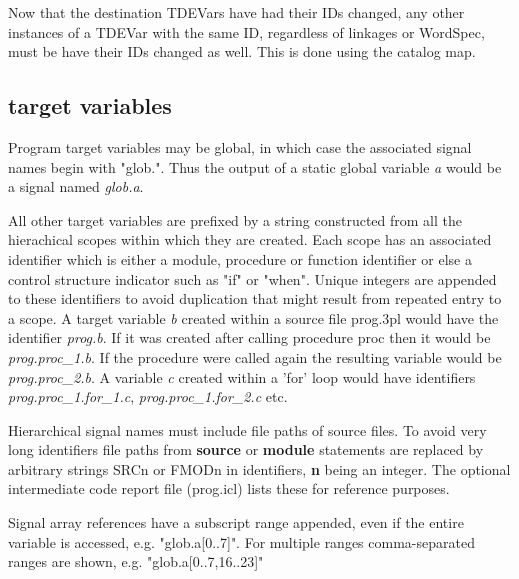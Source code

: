             Now that the destination TDEVars have had their IDs changed, any other
            instances of a TDEVar with the same ID, regardless of linkages or
            WordSpec, must be have their IDs changed as well. This is done using the
            catalog map.

            


        \subsection{target variables}

            Program target variables may be global, in which case the associated
            signal names begin with "glob.". Thus the output of a static global
            variable {\em a} would be a signal named {\em glob.a}.
            
            All other target variables are prefixed by a string constructed from all
            the hierachical scopes within which they are created. Each scope has an
            associated identifier which is either a module, procedure or function
            identifier or else a control structure indicator such as "if" or "when".
            Unique integers are appended to these identifiers to avoid duplication
            that might result from repeated entry to a scope. A target variable {\em
            b} created within a source file prog.3pl would have the identifier {\em
            prog.b}. If it was created after calling procedure proc then it would be
            {\em prog.proc\_1.b}. If the procedure were called again the resulting
            variable would be {\em prog.proc\_2.b}. A variable {\em c} created
            within a 'for' loop would have identifiers {\em prog.proc\_1.for\_1.c},
            {\em prog.proc\_1.for\_2.c} etc.
            
            Hierarchical signal names must include file paths of source files. To
            avoid very long identifiers file paths from {\bf source} or {\bf module}
            statements are replaced by arbitrary strings SRCn or FMODn in
            identifiers, {\bf n} being an integer. The optional intermediate code
            report file (prog.icl) lists these for reference purposes.

            Signal array references have a subscript range appended, even
            if the entire variable is accessed, e.g. "glob.a[0..7]". For
            multiple ranges comma-separated ranges are shown, e.g.
            "glob.a[0..7,16..23]"

